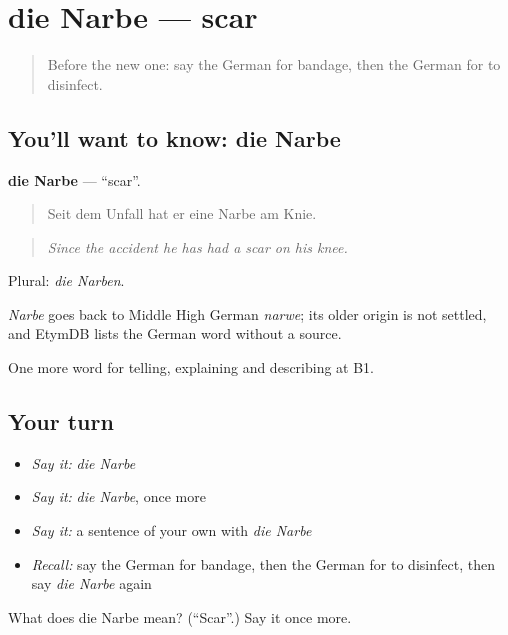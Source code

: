 \section[die Narbe]{die Narbe — scar}

\label{lesson:GE-C482-narbe}



\begin{quote}
Before the new one: say the German for bandage, then the German for to disinfect.
\end{quote}

\subsection*{You'll want to know: die Narbe}
\textbf{die Narbe} — \textquotedblleft{}scar\textquotedblright{}.

\begin{quote}
Seit dem Unfall hat er eine Narbe am Knie.
\end{quote}

\begin{quote}
\emph{Since the accident he has had a scar on his knee.}
\end{quote}

Plural: \emph{die Narben}.

\begin{cousinweb}
\emph{Narbe} goes back to Middle High German \emph{narwe}; its older origin is not settled, and EtymDB lists the German word without a source.
\end{cousinweb}

\begin{grammarlens}[title={What you've built}]
One more word for telling, explaining and describing at B1.
\end{grammarlens}

\subsection*{Your turn}
\begin{itemize}
\raggedright
  \item \emph{Say it:} \emph{die Narbe}
  \item \emph{Say it:} \emph{die Narbe}, once more
  \item \emph{Say it:} a sentence of your own with \emph{die Narbe}
  \item \emph{Recall:} say the German for bandage, then the German for to disinfect, then say \emph{die Narbe} again
\end{itemize}

\begin{tcolorbox}[breakable,colback=teal!4,colframe=teal!35!black,title={Before you move on}]
What does die Narbe mean? (\textquotedblleft{}Scar\textquotedblright{}.) Say it once more.
\end{tcolorbox}
